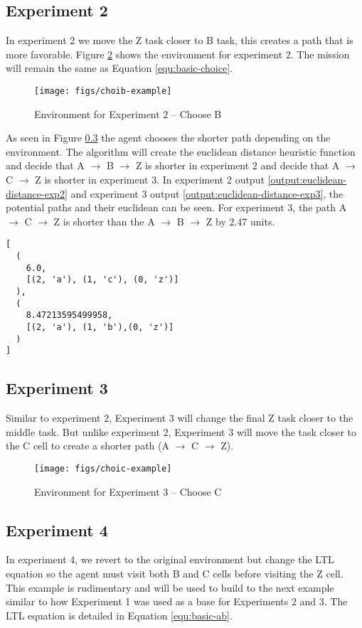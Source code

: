 \documentclass[letter paper, 10 pt, conference]{ieeeconf}
\begin{document}
\subsection{Experiment 2}
In experiment 2 we move the Z task closer to B task, this creates a path that is more favorable. Figure \ref{fig:env2-choib} shows the environment for experiment 2. The mission will remain the same as Equation \ref{equ:basic-choice}.

\begin{figure}[htb]
  \centering
  \texttt{[image: figs/choib-example]}
  \caption{Environment for Experiment 2 -- Choose B}
  \label{fig:env2-choib}
\end{figure}

As seen in Figure \ref{} the agent chooses the shorter path depending on the environment. The algorithm will create the euclidean distance heuristic function and decide that A $\rightarrow$ B $\rightarrow$ Z is shorter in experiment 2 and decide that A $\rightarrow$ C $\rightarrow$ Z is shorter in experiment 3. In experiment 2 output \ref{output:euclidean-distance-exp2} and experiment 3 output \ref{output:euclidean-distance-exp3}, the potential paths and their euclidean can be seen. For experiment 3, the path A $\rightarrow$ C $\rightarrow$ Z is shorter than the A $\rightarrow$ B $\rightarrow$ Z by 2.47 units.

\begin{verbatim}
[
  (
    6.0,
    [(2, 'a'), (1, 'c'), (0, 'z')]
  ),
  (
    8.47213595499958,
    [(2, 'a'), (1, 'b'),(0, 'z')]
  )
]
\end{verbatim}

\subsection{Experiment 3}
Similar to experiment 2, Experiment 3 will change the final Z task closer to the middle task. But unlike experiment 2, Experiment 3 will move the task closer to the C cell to create a shorter path (A $\rightarrow$ C $\rightarrow$ Z). 

\begin{figure}[htb]
  \centering
  \texttt{[image: figs/choic-example]}
  \caption{Environment for Experiment 3 -- Choose C}
  \label{fig:env2-choib}
\end{figure}


\subsection{Experiment 4}
In experiment 4, we revert to the original environment but change the LTL equation so the agent must visit both B and C cells before visiting the Z cell. This example is rudimentary and will be used to build to the next example similar to how Experiment 1 was used as a base for Experiments 2 and 3. The LTL equation is detailed in Equation \ref{equ:basic-ab}.
\end{document}
